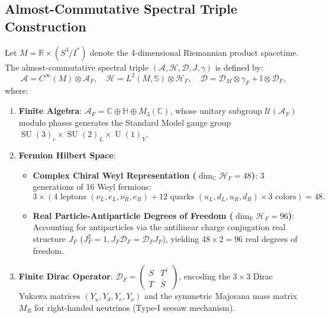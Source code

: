 \documentclass[11pt,a4paper]{article}
\theoremstyle{definition}
\DeclareMathOperator{\SU}{SU}
\DeclareMathOperator{\U}{U}
\begin{document}
\subsection{Almost-Commutative Spectral Triple Construction}
Let $M = \mathbb{R} \times (S^3 / I^*)$ denote the 4-dimensional Riemannian product spacetime. The almost-commutative spectral triple $(\mathcal{A}, \mathcal{H}, \mathcal{D}, J, \gamma)$ is defined by:
\begin{equation}
\mathcal{A} = C^\infty(M) \otimes \mathcal{A}_F, \quad \mathcal{H} = L^2(M, \mathbb{S}) \otimes \mathcal{H}_F, \quad \mathcal{D} = \mathcal{D}_M \otimes \gamma_F + \mathbb{I} \otimes \mathcal{D}_F,
\end{equation}
where:
\begin{enumerate}
\item \textbf{Finite Algebra}: $\mathcal{A}_F = \mathbb{C} \oplus \mathbb{H} \oplus M_3(\mathbb{C})$, whose unitary subgroup $\mathcal{U}(\mathcal{A}_F)$ modulo phases generates the Standard Model gauge group $\SU(3)_c \times \SU(2)_L \times \U(1)_Y$.
\item \textbf{Fermion Hilbert Space}:
\begin{itemize}
\item \textbf{Complex Chiral Weyl Representation ($\dim_{\mathbb{C}} \mathcal{H}_F = 48$)}: 3 generations of 16 Weyl fermions:
\begin{equation}
3 \times \left( 4 \text{ leptons } (\nu_L, e_L, \nu_R, e_R) + 12 \text{ quarks } (u_L, d_L, u_R, d_R) \times 3 \text{ colors} \right) = 48.
\end{equation}
\item \textbf{Real Particle-Antiparticle Degrees of Freedom ($\dim_{\mathbb{R}} \mathcal{H}_F = 96$)}: Accounting for antiparticles via the antilinear charge conjugation real structure $J_F$ ($J_F^2 = 1, J_F \mathcal{D}_F = \mathcal{D}_F J_F$), yielding $48 \times 2 = 96$ real degrees of freedom.
\end{itemize}
\item \textbf{Finite Dirac Operator}: $\mathcal{D}_F = \begin{pmatrix} S & T^\dagger \\ T & \overline{S} \end{pmatrix}$, encoding the $3 \times 3$ Dirac Yukawa matrices $(Y_u, Y_d, Y_e, Y_\nu)$ and the symmetric Majorana mass matrix $M_R$ for right-handed neutrinos (Type-I seesaw mechanism).
\end{enumerate}
\end{document}
